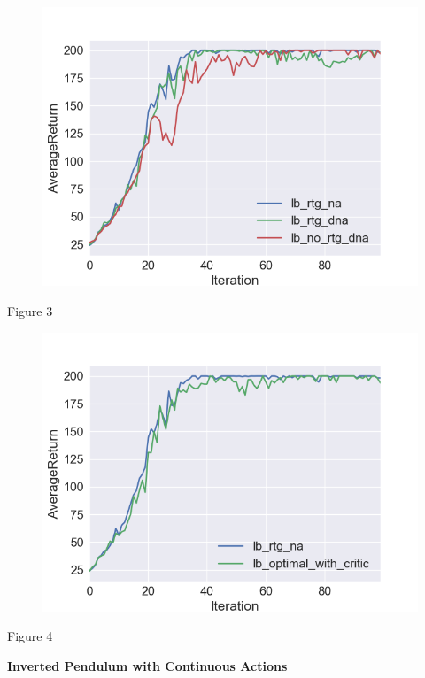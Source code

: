 \documentclass[10pt]{article}
\makeatletter
\def\maxwidth{\ifdim\Gin@nat@width>\linewidth\linewidth
\else\Gin@nat@width\fi}
\let\Oldincludegraphics\includegraphics
\renewcommand{\includegraphics}[1]{\Oldincludegraphics[width=\maxwidth]{#1}}
\makeatother
\begin{document}
\begin{figure}
\centering
\includegraphics{Images/large_optimal.png}
\caption{}
\end{figure}

Figure 3

\begin{figure}
\centering
\includegraphics{Images/with-without-critic.png}
\caption{}
\end{figure}

Figure 4

\textbf{Inverted Pendulum with Continuous Actions}
\end{document}
